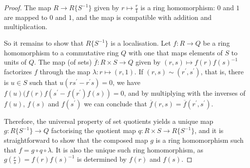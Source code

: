 \documentclass{amsart}
\theoremstyle{plain}
\numberwithin{equation}{section} %
\numberwithin{figure}{section} %
\theoremstyle{plain}
\theoremstyle{plain}
\theoremstyle{plain}
\theoremstyle{plain}
\theoremstyle{plain}
\theoremstyle{plain}
\theoremstyle{remark}
\theoremstyle{remark}
\theoremstyle{remark}
\begin{document}
\begin{proof}
The map $R \rightarrow R\{S^{-1}\}$ given by $r \mapsto \frac{r}{1}$ is a ring homomorphism: $0$ and $1$ are mapped to $0$ and $1$, and the map is compatible with addition and multiplication.

So it remains to show that $R\{S^{-1}\}$ is a localisation. Let $f: R \rightarrow Q$ be a ring homomorphism to a commutative ring $Q$ with one that maps elements of $S$ to units of $Q$. The map (of sets) $\overline{f}: R \times S \rightarrow Q$ given by $(r,s) \mapsto f(r)f(s)^{-1}$ factorizes $f$ through the map $\lambda: r \mapsto (r,1)$. If $(r,s) \sim (r^\prime,s^\prime)$, that is, there is $u \in S$ such that $u(rs^\prime - r^\prime s) = 0$, we have $f(u)(f(r)f(s^\prime - f(r^\prime)f(s)) = 0$, and by multiplying with the inverses of $f(u)$, $f(s)$ and $f(s^\prime)$ we can conclude that
$\overline{f}(r,s) = \overline{f}(r^\prime,s^\prime)$. 

Therefore, the universal property of set quotients yields a unique map $g : R\{S^{-1}\} \rightarrow Q$ factorising the quotient map $q : R \times S \rightarrow R\{S^{-1}\}$, and it is straightforward to show that the composed map $g$ is a ring homomorphism such that $f = g \circ q \circ \lambda$. It is also the unique such ring homomorphism, as $g(\frac{r}{s}) = f(r)f(s)^{-1}$ is determined by $f(r)$ and $f(s)$.  
\end{proof}
\end{document}
